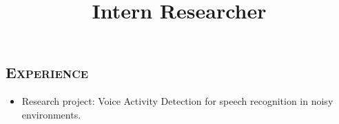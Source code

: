\begin{resume}
\vspace*{-4pt}
\section{\textsc{Experience}}

\title{Intern Researcher}
\begin{position}
\vspace*{-8pt}
\begin{itemize}
\item Research project: Voice Activity Detection for speech recognition in noisy environments.
\end{itemize} 
\end{position}





\end{resume}
